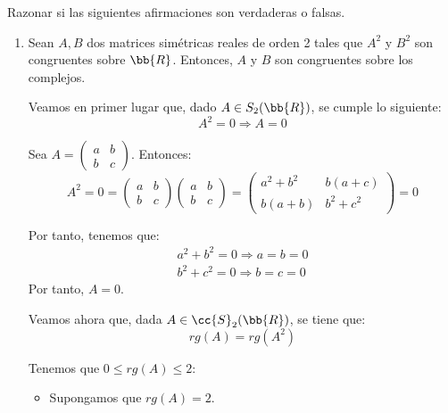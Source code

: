 \documentclass[12pt]{article}
\begin{document}
\begin{ejercicio}
    Razonar si las siguientes afirmaciones son verdaderas o falsas.
    \begin{enumerate}
        \item Sean $A,B$ dos matrices simétricas reales de orden 2 tales que $A^2$ y $B^2$ son congruentes sobre $\bb{R}$. Entonces, $A$ y $B$ son congruentes sobre los complejos.

        Veamos en primer lugar que, dado $A\in S_2(\bb{R})$, se cumple lo siguiente:
        \begin{equation} \label{Ej2.1.A0}
            A^2=0 \Longrightarrow A=0
        \end{equation}
        
        Sea $A=\left(\begin{array}{cc}
            a & b \\
            b & c
        \end{array}\right)$. Entonces:
        \begin{equation*}
            A^2=0=\left(\begin{array}{cc}
            a & b \\
            b & c
        \end{array}\right)
        \left(\begin{array}{cc}
            a & b \\
            b & c
        \end{array}\right)=
        \left(\begin{array}{cc}
            a^2+b^2 & b(a+c) \\
            b(a+b) & b^2+c^2
        \end{array}\right) = 0
        \end{equation*}

        Por tanto, tenemos que:
        \begin{gather*}
            a^2+b^2=0 \Longrightarrow a=b=0 \\
            b^2+c^2=0 \Longrightarrow b=c=0
        \end{gather*}
        Por tanto, $A=0$.

        Veamos ahora que, dada $A\in \cc{S}_2(\bb{R})$, se tiene que:
        \begin{equation}\label{Ej2.1.rg}
            rg(A)=rg(A^2)
        \end{equation}

        Tenemos que $0\leq rg(A)\leq 2$:
        \begin{itemize}
            \item Supongamos que $rg(A)=2$.


\end{itemize}
\end{enumerate}
\end{ejercicio}
\end{document}
